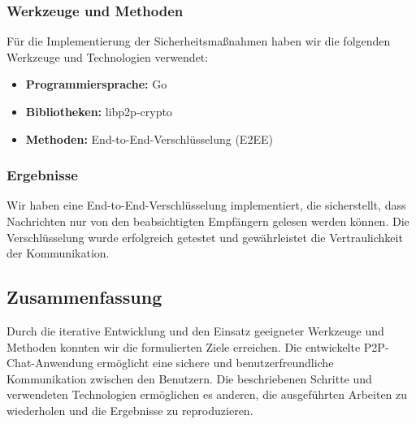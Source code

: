 \subsubsection{Werkzeuge und Methoden}
Für die Implementierung der Sicherheitsmaßnahmen haben wir die folgenden Werkzeuge und Technologien verwendet:
\begin{itemize}
    \item \textbf{Programmiersprache:} Go
    \item \textbf{Bibliotheken:} libp2p-crypto
    \item \textbf{Methoden:} End-to-End-Verschlüsselung (E2EE)
\end{itemize}

\subsubsection{Ergebnisse}
Wir haben eine End-to-End-Verschlüsselung implementiert, die sicherstellt, dass Nachrichten nur von den beabsichtigten Empfängern gelesen werden können. Die Verschlüsselung wurde erfolgreich getestet und gewährleistet die Vertraulichkeit der Kommunikation.

\subsection{Zusammenfassung}
Durch die iterative Entwicklung und den Einsatz geeigneter Werkzeuge und Methoden konnten wir die formulierten Ziele erreichen. Die entwickelte P2P-Chat-Anwendung ermöglicht eine sichere und benutzerfreundliche Kommunikation zwischen den Benutzern. Die beschriebenen Schritte und verwendeten Technologien ermöglichen es anderen, die ausgeführten Arbeiten zu wiederholen und die Ergebnisse zu reproduzieren.
